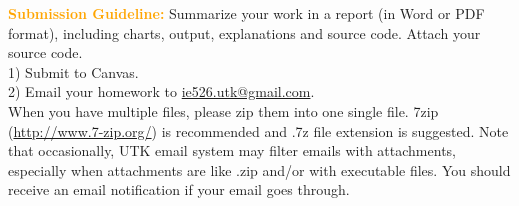 \documentclass{article}
\begin{document}
\vskip 0.3in 

\textcolor{orange}{\bf Submission Guideline:} Summarize your work in a  report (in Word or PDF format), including charts, output, explanations and source code. Attach your source code. \\
1) Submit to Canvas. \\
2) Email your homework to \url{ie526.utk@gmail.com}. \\
When you have multiple files, please zip them
into one single file. 7zip (\url{http://www.7-zip.org/}) is recommended and .7z file extension is suggested. Note that occasionally, UTK email system may filter emails with attachments, especially when attachments are like .zip and/or with executable files. You should receive an email notification if your email goes through. 
\vskip 0.2in
\end{document}
